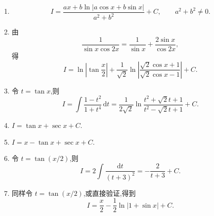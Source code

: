 \begin{solution}
    \begin{enumerate}
        \item
              \[
                  I=\dfrac{ax+b\ln|a\cos x+b\sin x|}{a^2+b^2}+C,
                  \qquad a^2+b^2\neq0.
              \]
        \item 由
              \[
                  \dfrac{1}{\sin x\cos2x}=\dfrac{1}{\sin x}+\dfrac{2\sin x}{\cos2x},
              \]
              得
              \[
                  I=\ln\left|\tan\dfrac{x}{2}\right|
                  +\dfrac{1}{\sqrt2}\ln\left|\dfrac{\sqrt2\cos x+1}{\sqrt2\cos x-1}\right|+C.
              \]
        \item 令 $t=\tan x$,则
              \[
                  I=\int\dfrac{1-t^2}{1+t^4}\,\mathrm{d}t
                  =\dfrac{1}{2\sqrt2}\ln\dfrac{t^2+\sqrt2t+1}{t^2-\sqrt2t+1}+C.
              \]
        \item $\displaystyle I=\tan x+\sec x+C$.
        \item $\displaystyle I=x-\tan x+\sec x+C$.
        \item 令 $t=\tan(x/2)$,则
              \[
                  I=2\int\dfrac{\mathrm{d}t}{(t+3)^2}
                  =-\dfrac{2}{t+3}+C.
              \]
        \item 同样令 $t=\tan(x/2)$,或直接验证,得到
              \[
                  I=\dfrac{x}{2}-\dfrac{1}{2}\ln|1+\sin x|+C.
              \]
    \end{enumerate}
\end{solution}
